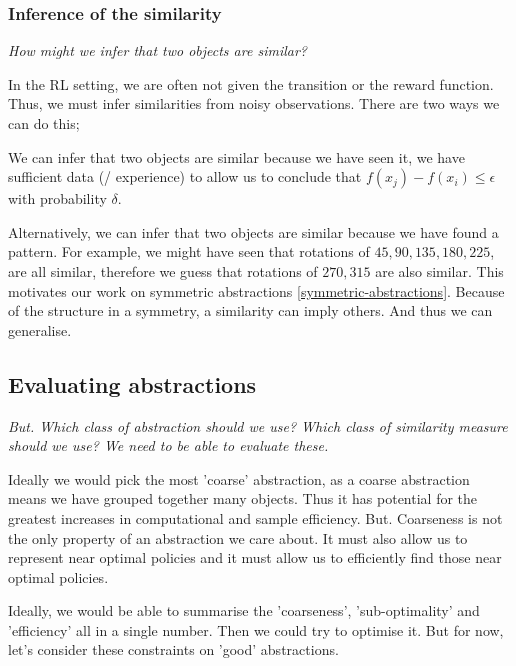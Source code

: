 \subsubsection{Inference of the similarity}

\begin{displayquote}
	\textit{How might we infer that two objects are similar?}
\end{displayquote}


In the RL setting, we are often not given the transition or the reward function.
Thus, we must infer similarities from noisy observations. There are two ways we can do this;

We can infer that two objects are similar because we have seen it,
we have sufficient data (/ experience) to allow us to conclude that
$f(x_j) - f(x_i) \le \epsilon$ with probability $\delta$.

Alternatively, we can infer that two objects are similar because we have found a pattern.
For example, we might have seen that rotations of $45, 90, 135$$, 180, 225$, are all similar,
therefore we guess that rotations of $270, 315$ are also similar.
This motivates our work on symmetric abstractions \ref{symmetric-abstractions}.
Because of the structure in a symmetry, a similarity can imply others. And thus we can generalise.

\subsection{Evaluating abstractions}

\begin{displayquote}
\textit{But.
Which class of abstraction should we use?
Which class of similarity measure should we use?
We need to be able to evaluate these.}
\end{displayquote}

Ideally we would pick the most 'coarse' abstraction, as a coarse abstraction means we have grouped together many objects.
Thus it has potential for the greatest increases in computational and sample efficiency.
But. Coarseness is not the only property of an abstraction we care about.
It must also allow us to represent near optimal policies and it must allow us
to efficiently find those near optimal policies.

Ideally, we would be able to summarise the 'coarseness', 'sub-optimality' and 'efficiency' all in a single number.
Then we could try to optimise it. But for now, let's consider these constraints on 'good' abstractions.

